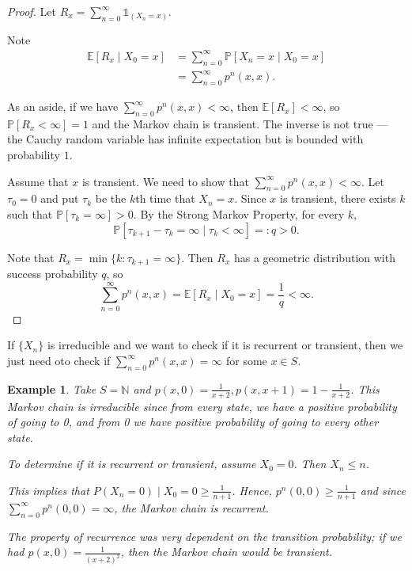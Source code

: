 \documentclass{tufte-handout}
\newcommand*\N{\mathbb{N}}
\newcommand*\E{\mathbb{E}}
\renewcommand*\P{\mathbb{P}}
\newtheorem{ex}[thm]{Example}
\theoremstyle{definition}
\begin{document}
\begin{proof}
	Let $R_x = \sum\limits_{n=0}^{\infty} \mathds{1}_{\left( X_n = x \right)}$.

	Note
	\begin{align*}
		\E\left[R_x \mid X_0 = x\right] &= \sum\limits_{n=0}^{\infty} \P\left[X_n = x \mid X_0 = x\right]  \\
										&= \sum\limits_{n=0}^{\infty} p^n(x,x)
	.\end{align*}

	As an aside, if we have $\sum\limits_{n=0}^{\infty} p^n(x,x) < \infty$, then $\E\left[R_x\right] < \infty$, so $\P\left[R_x < \infty\right] = 1$ and the Markov chain is transient. The inverse is not true --- the Cauchy random variable has infinite expectation but is bounded with probability $1$.

	Assume that $x$ is transient. We need to show that $\sum\limits_{n=0}^{\infty} p^n(x,x) < \infty$.
	Let $\tau_0 = 0$ and put $\tau_k$ be the $k$th time that $X_n = x$.
	Since $x$ is transient, there exists $k$ such that $\P\left[\tau_k = \infty\right] > 0$.
	By the Strong Markov Property, for every $k$, \[
		\P\left[\tau_{k+1} - \tau_k = \infty \mid \tau_k < \infty\right] =: q > 0
	.\] 

	Note that $R_x =\min \{k : \tau_{k+1} = \infty\}$. Then $R_x$ has a geometric distribution with success probability $q$, so \[
		\sum\limits_{n=0}^{\infty} p^n(x,x) = \E\left[R_x \mid X_0= x\right] = \frac{1}{q} < \infty
	.\] 

\end{proof}

If $\{X_n\}$ is irreducible and we want to check if it is recurrent or transient, then we just need oto check if $\sum\limits_{n=0}^{\infty} p^n(x,x) = \infty$ for some $x \in S$. 

\begin{ex}
	Take $S = \N$ and $p(x,0) = \frac{1}{x+2}, p(x,x+1) = 1 - \frac{1}{x+2}$. 
	This Markov chain is irreducible since from every state, we have a positive probability of going to 0, and from 0 we have positive probability of going to every other state.

	To determine if it is recurrent or transient, assume $X_0 = 0$. Then $X_n \le n$.

	This implies that $P(X_n = 0) \mid X_{0} = 0 \ge \frac{1}{n+1}$. Hence, $p^n(0,0) \ge \frac{1}{n+1}$ and since $\sum\limits_{n=0}^{\infty} p^n(0,0) = \infty$, the Markov chain is recurrent.

	The property of recurrence was very dependent on the transition probability; if we had $p(x,0) = \frac{1}{\left( x+2 \right)^2}$, then the Markov chain would be transient.
\end{ex}
\end{document}
